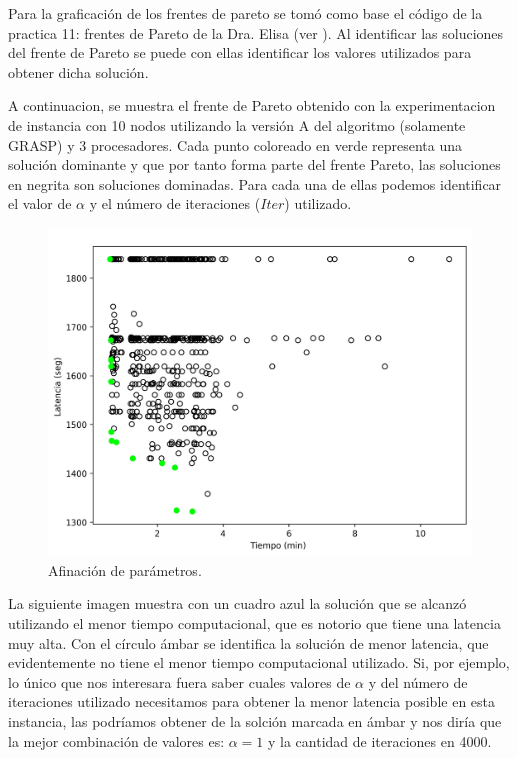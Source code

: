 \documentclass[review]{elsarticle}
\begin{document}
Para la graficación de los frentes de pareto se tomó como base el código de la practica 11: frentes de Pareto de la Dra. Elisa (ver \cite{frentePareto}). Al identificar las soluciones del frente de Pareto se puede con ellas identificar los valores utilizados para obtener dicha solución.

A continuacion, se muestra el frente de Pareto obtenido con la experimentacion de instancia con 10 nodos utilizando la versión A del algoritmo (solamente GRASP) y 3 procesadores. Cada punto coloreado en verde representa una solución dominante y que por tanto forma parte del frente Pareto, las soluciones en negrita son soluciones dominadas. Para cada una de ellas podemos identificar el valor de $\alpha$ y el número de iteraciones ($Iter$) utilizado.

 \begin{figure}[h!]
	\centering
	\includegraphics[width=0.7\linewidth]{10_A_frente.png}
	\caption{Afinación de parámetros.}
	\label{fig:imagen4}
	
\end{figure}


La siguiente imagen muestra con un cuadro azul la solución que se alcanzó utilizando el menor tiempo computacional, que es notorio que tiene una latencia muy alta. Con el círculo ámbar se identifica la solución de menor latencia, que evidentemente no tiene el menor tiempo computacional utilizado. Si, por ejemplo, lo único que nos interesara fuera saber cuales valores de $\alpha$ y del número de iteraciones utilizado necesitamos para obtener la menor latencia posible en esta instancia, las podríamos obtener de la solción marcada en ámbar y nos diría que la mejor combinación de valores es: $\alpha = 1$ y la cantidad de iteraciones en 4000.
\end{document}
